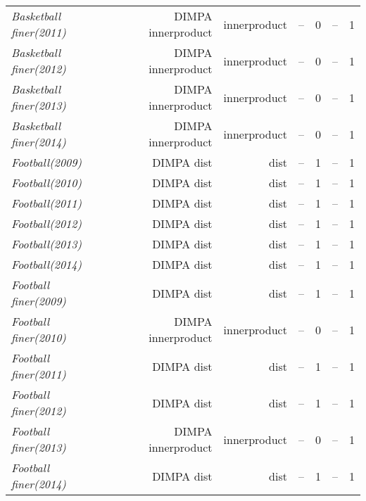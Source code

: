 \documentclass[nohyperref]{article}
\theoremstyle{plain}
\theoremstyle{definition}
\theoremstyle{remark}
\begin{document}
\begin{table*}[!ht]
{\begin{tabular}{lrrrrrr}
			{\it Basketball finer(2011)} & DIMPA innerproduct & innerproduct & -- & 0 & -- & 1 \\
			{\it Basketball finer(2012)} & DIMPA innerproduct & innerproduct & -- & 0 & -- & 1 \\
			{\it Basketball finer(2013)} & DIMPA innerproduct & innerproduct & -- & 0 & -- & 1 \\
			{\it Basketball finer(2014)} & DIMPA innerproduct & innerproduct & -- & 0 & -- & 1 \\
			{\it Football(2009)} & DIMPA dist & dist & -- & 1 & -- & 1 \\
			{\it Football(2010)} & DIMPA dist & dist & -- & 1 & -- & 1 \\
			{\it Football(2011)} & DIMPA dist & dist & -- & 1 & -- & 1 \\
			{\it Football(2012)} & DIMPA dist & dist & -- & 1 & -- & 1 \\
			{\it Football(2013)} & DIMPA dist & dist & -- & 1 & -- & 1 \\
			{\it Football(2014)} & DIMPA dist & dist & -- & 1 & -- & 1 \\
			{\it Football finer(2009)} & DIMPA dist & dist & -- & 1 & -- & 1 \\
			{\it Football finer(2010)} & DIMPA innerproduct & innerproduct & -- & 0 & -- & 1 \\
			{\it Football finer(2011)} & DIMPA dist & dist & -- & 1 & -- & 1 \\
			{\it Football finer(2012)} & DIMPA dist & dist & -- & 1 & -- & 1 \\
			{\it Football finer(2013)} & DIMPA innerproduct & innerproduct & -- & 0 & -- & 1 \\
			{\it Football finer(2014)} & DIMPA dist & dist & -- & 1 & -- & 1 \\
\bottomrule
\end{tabular}}
\end{table*}
\end{document}
